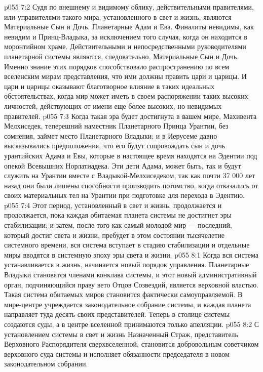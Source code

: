 \vs p055 7:2 Судя по внешнему и видимому облику, действительными правителями, или управителями такого мира, установленного в свет и жизнь, являются Материальные Сын и Дочь, Планетарные Адам и Ева. Финалиты невидимы, как невидим и Принц\hyp{}Владыка, за исключением того случая, когда он находится в моронтийном храме. Действительными и непосредственными руководителями планетарной системы являются, следовательно, Материальные Сын и Дочь. Именно знание этих порядков способствовало распространению по всем вселенским мирам представления, что ими должны править цари и царицы. И цари и царицы оказывают благотворное влияние в таких идеальных обстоятельствах, когда мир может иметь в своем распоряжении таких высоких личностей, действующих от имени еще более высоких, но невидимых правителей.
\vs p055 7:3 Когда такая эра будет достигнута в вашем мире, Махивента Мелхиседек, теперешний наместник Планетарного Принца Урантии, без сомнения, займет место Планетарного Владыки; и в Иерусеме давно высказывались предположения, что его будут сопровождать сын и дочь урантийских Адама и Евы, которые в настоящее время находятся на Эдентии под опекой Всевышних Норлатиадека. Эти дети Адама, может быть, так и будут служить на Урантии вместе с Владыкой\hyp{}Мелхиседеком, так как почти 37 000 лет назад они были лишены способности производить потомство, когда отказались от своих материальных тел на Урантии при подготовке для перехода в Эдентию.
\vs p055 7:4 \pc Этот период, установленный в свет и жизнь, продолжается и продолжается, пока каждая обитаемая планета системы не достигнет эры стабилизации; и затем, после того как самый молодой мир --- последний, который достиг света и жизни, пребудет в этом состоянии тысячелетие системного времени, вся система вступает в стадию стабилизации и отдельные миры вводятся в системную эпоху эры света и жизни.
\vs p055 8:1 Когда вся система устанавливается в жизнь, начинается новый порядок управления. Планетарные Владыки становятся членами конклава системы, и этот новый административный орган, подчиняющийся праву вето Отцов Созвездий, является верховной властью. Такая система обитаемых миров становится фактически самоуправляемой. В мире\hyp{}центре учреждается законодательное собрание системы, и каждая планета направляет туда десять своих представителей. Теперь в столице системы создаются суды, а в центре вселенной принимаются только апелляции.
\vs p055 8:2 С установлением системы в свет и жизнь Назначенный Страж, представитель Верховного Распорядителя сверхвселенной, становится добровольным советчиком верховного суда системы и исполняет обязанности председателя в новом законодательном собрании.
